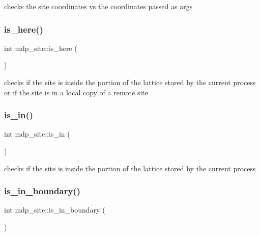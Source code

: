 checks the site coordinates vs the coordinates passed as args 

\mbox{\label{classmdp__site_a1457471b74c722514712f1efb1093f63}} 
\subsubsection{\texorpdfstring{is\+\_\+here()}{is\_here()}}
{\footnotesize\ttfamily int mdp\+\_\+site\+::is\+\_\+here (\begin{DoxyParamCaption}{ }\end{DoxyParamCaption})\hspace{0.3cm}{\ttfamily [inline]}}

checks if the site is inside the portion of the lattice stored by the current process or if the site is in a local copy of a remote site \mbox{\label{classmdp__site_a57ff5d47780a90ad36c9368360ad2d89}} 
\subsubsection{\texorpdfstring{is\+\_\+in()}{is\_in()}}
{\footnotesize\ttfamily int mdp\+\_\+site\+::is\+\_\+in (\begin{DoxyParamCaption}{ }\end{DoxyParamCaption})\hspace{0.3cm}{\ttfamily [inline]}}

checks if the site is inside the portion of the lattice stored by the current process \mbox{\label{classmdp__site_a57188578cccbd53d6ff5ef5b791d32a4}} 
\subsubsection{\texorpdfstring{is\+\_\+in\+\_\+boundary()}{is\_in\_boundary()}}
{\footnotesize\ttfamily int mdp\+\_\+site\+::is\+\_\+in\+\_\+boundary (\begin{DoxyParamCaption}{ }\end{DoxyParamCaption})\hspace{0.3cm}{\ttfamily [inline]}}

